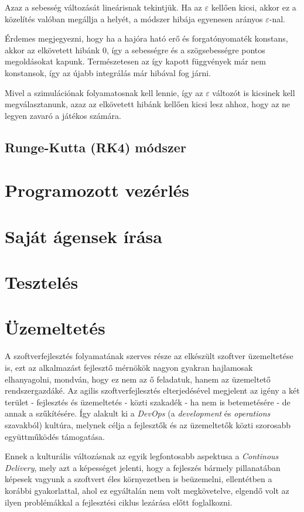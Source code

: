 Azaz a sebesség változását lineárisnak tekintjük. Ha az $\varepsilon$ kellően kicsi,
akkor ez a közelítés valóban megállja a helyét, a módszer hibája egyenesen arányos
$\varepsilon$-nal.

Érdemes megjegyezni, hogy ha a hajóra ható erő és forgatónyomaték konstans,
akkor az elkövetett hibánk $0$, így a sebességre és a szögsebességre pontos megoldásokat kapunk.
Természetesen az így kapott függvények már nem konstansok, így az újabb integrálás
már hibával fog járni.

Mivel a szimulációnak folyamatosnak kell lennie, így az $\varepsilon$ változót is
kicsinek kell megválasztanunk, azaz az elkövetett hibánk kellően kicsi lesz ahhoz,
hogy az ne legyen zavaró a játékos számára.

\subsection{Runge-Kutta (RK4) módszer}

\section{Programozott vezérlés}

\section{Saját ágensek írása}

\section{Tesztelés}

\section{Üzemeltetés}

A szoftverfejlesztés folyamatának szerves része az elkészült szoftver
üzemeltetése is, ezt az alkalmazást fejlesztő mérnökök nagyon gyakran
hajlamosak elhanyagolni, mondván, hogy ez nem az ő feladatuk, hanem az
üzemeltető rendszergazdáké.  Az agilis szoftverfejlesztés elterjedésével
megjelent az igény a két terület - fejlesztés és üzemeltetés - közti szakadék -
ha nem is betemetésére - de annak a szűkítésére.  Így alakult ki a
\emph{DevOps} (a \emph{development} és \emph{operations} szavakból) kultúra,
melynek célja a fejlesztők és az üzemeltetők közti szorosabb együttműködés
támogatása.

Ennek a kulturális változásnak az egyik legfontosabb aspektusa a
\emph{Continous Delivery}, mely azt a képességet jelenti, hogy a fejleszés
bármely pillanatában képesek vagyunk a szoftvert éles környezetben is
beüzemelni, ellentétben a korábbi gyakorlattal, ahol ez egyáltalán nem volt
megkövetelve, elgendő volt az ilyen problémákkal a fejlesztési ciklus
lezárása előtt foglalkozni.


